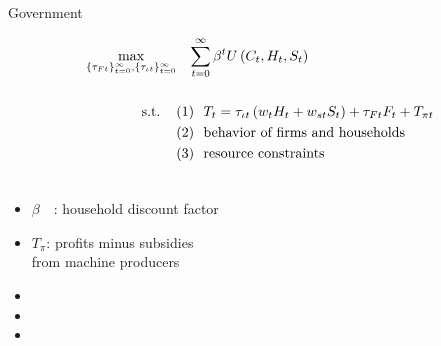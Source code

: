\documentclass[11pt,aspectratio=169]{beamer}
\begin{document}
\begin{frame}{ Government}
	\hypertarget{gov}{}
	\vspace{-4mm}
	\centering
	\begin{minipage}[t!]{1\textwidth}
		\begin{align*}
			\max_{\{\tau_{Ft}\}_{t=0}^{\infty}, \{\tau_{\iota t}\}_{t=0}^{\infty}}&\hspace{3mm} \sum_{t=0}^{\infty}\beta^t U\left(C_t,H_t, S_t\right)\\ \ \\
			\text{s.t.} \hspace{4mm}
			&{ (1)\ \ T_t=\tau_{\iota t}\left(w_{t}H_{t}+w_{st}S_{t}\right)+{{\tau_{Ft}}}F_{t}}+T_{\pi t}\\
			& {(2)\ \  \text{behavior of firms and households}}\\
			& {(3)\ \ \text{resource constraints} }\\
			& \ %
		\end{align*}
	\end{minipage}
	
	\small
	\vspace{0mm}
	\hspace{-10mm}
	\begin{minipage}[t!]{0.5\textwidth}
		\vspace{7mm}
		\begin{itemize}
			\item[] $\beta$\ \ : household discount factor\vspace{-2mm}
			\item[] $T_\pi$: profits minus subsidies \\ \hspace{5.5mm} from machine producers \vspace{0mm}
		\end{itemize}
	\end{minipage}
	\begin{minipage}[t!]{0.4\textwidth}
		\vspace{8mm}
		\begin{itemize}
			\item[] %
			\vspace{-2mm}	
			\item[] %
			\item[] %
		\end{itemize}
	\end{minipage}
\end{frame}
\end{document}
